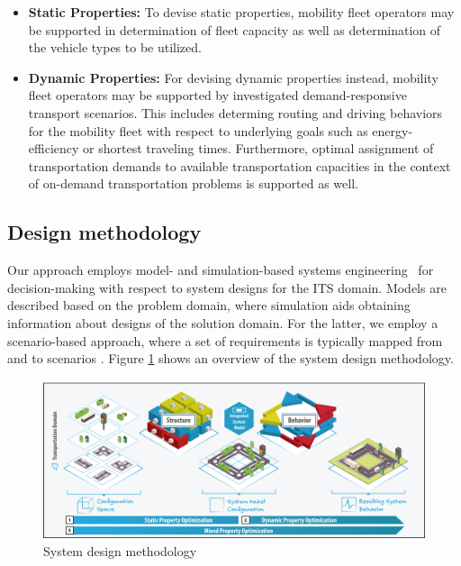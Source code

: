 \documentclass[a4paper,twoside]{article}
\begin{document}
\begin{itemize}
	\item \textbf{Static Properties:} To devise static properties, mobility fleet operators may be supported in determination of fleet capacity as well as determination of the vehicle types to be utilized.
	\item \textbf{Dynamic Properties:} For devising dynamic properties instead, mobility fleet operators may be supported by investigated demand-responsive transport scenarios. This includes determing routing and driving behaviors for the mobility fleet with respect to underlying goals such as energy-efficiency or shortest traveling times. Furthermore, optimal assignment of transportation demands to available transportation capacities in the context of on-demand transportation problems is supported as well.
\end{itemize}
	
	
		
	\subsection{Design methodology}
	\label{sec:methodology}

	
	Our approach employs model- and simulation-based systems engineering~\cite{gianni2014modeling} for decision-making with respect to system designs for the ITS domain.
	Models are described based on the problem domain, where simulation aids obtaining information about designs of the solution domain. 
	For the latter, we employ a scenario-based approach, where a set of requirements is typically mapped from and to scenarios \cite{sutcliffe_supporting_1998}. Figure \ref{fig:concept} shows an overview of the system design methodology.
	
	\begin{figure}[!ht]
		\centering
		\includegraphics[width=1.0\columnwidth]{property_optimization.png}
		\caption{System design methodology}
		\label{fig:concept}
	\end{figure}
	
\end{document}
